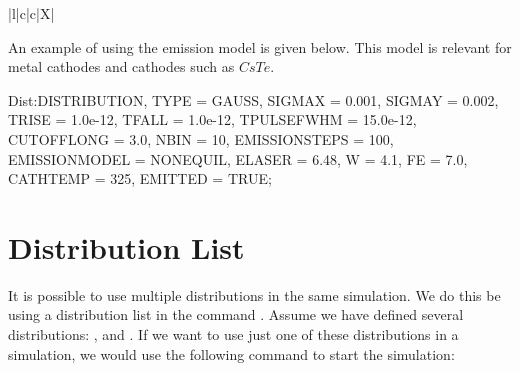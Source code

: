 \begin{table}[!htb]
  \begin{center}\footnotesize
    \caption{Attributes for the  and  emission models.}
    \label{tab:distattremitmodelnonequil}
    \begin{tabularx}{\textwidth-1cm}{|l|c|c|X|}
      \hline
      \hline
      \hline
    \end{tabularx}
  \end{center}
\end{table}

An example of using the  emission model is given below. This model is relevant for metal
cathodes and cathodes such as $CsTe$.

\begin{example}
Dist:DISTRIBUTION, TYPE = GAUSS,
                   SIGMAX = 0.001,
                   SIGMAY = 0.002,
                   TRISE = 1.0e-12,
                   TFALL = 1.0e-12,
                   TPULSEFWHM = 15.0e-12,
                   CUTOFFLONG = 3.0,
                   NBIN = 10,
                   EMISSIONSTEPS = 100,
                   EMISSIONMODEL = NONEQUIL,
                   ELASER = 6.48,
                   W = 4.1,
                   FE = 7.0,
                   CATHTEMP = 325,
                   EMITTED = TRUE;
\end{example}



\section{Distribution List}
\label{sec:distlist}
\FloatBarrier

It is possible to use multiple distributions in the same simulation. We do this be using a distribution list
in the  command . Assume we have defined several distributions: ,
 and . If we want to use just one of these distributions in a simulation, we would use the
following  command to start the simulation:

